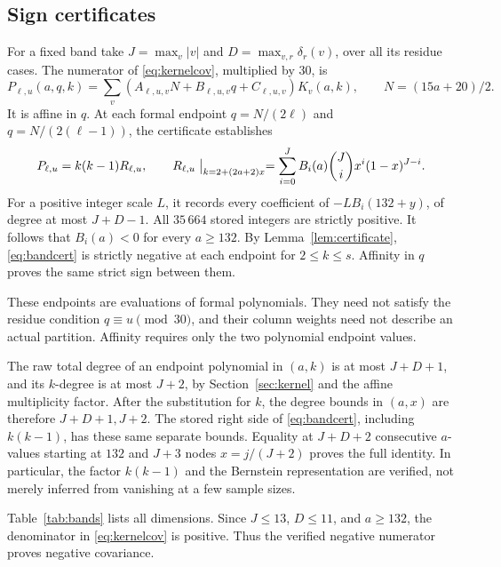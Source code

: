 \documentclass[11pt,a4paper]{article}
\theoremstyle{remark}
\numberwithin{equation}{section}
\begin{document}
\subsection{Sign certificates}
For a fixed band take \(J=\max_v|v|\) and
\(D=\max_{v,r}\delta_r(v)\), over all its residue cases.
The numerator of \eqref{eq:kernelcov}, multiplied by \(30\), is
\begin{equation}\label{eq:bandraw}
 P_{\ell,u}(a,q,k)=
 \sum_v(A_{\ell,u,v}N+B_{\ell,u,v}q+C_{\ell,u,v})K_v(a,k),
 \qquad N=(15a+20)/2.
\end{equation}
It is affine in \(q\).
At each formal endpoint \(q=N/(2\ell)\) and
\(q=N/(2(\ell-1))\), the certificate establishes
\begin{equation}\label{eq:bandcert}
 P_{\ell,u}=k(k-1)R_{\ell,u},\qquad
 R_{\ell,u}\bigm|_{k=2+(2a+2)x}
 =\sum_{i=0}^{J} B_i(a)\binom Ji x^i(1-x)^{J-i}.
\end{equation}
For a positive integer scale \(L\), it records every coefficient of
\(-L B_i(132+y)\), of degree at most \(J+D-1\).
All \(35\,664\) stored integers are strictly positive.
It follows that \(B_i(a)<0\) for every \(a\ge132\).
By Lemma~\ref{lem:certificate}, \eqref{eq:bandcert} is strictly
negative at each endpoint for \(2\le k\le s\).
Affinity in \(q\) proves the same strict sign between them.

These endpoints are evaluations of formal polynomials.
They need not satisfy the residue condition \(q\equiv u\pmod{30}\),
and their column weights need not describe an actual partition.
Affinity requires only the two polynomial endpoint values.

The raw total degree of an endpoint polynomial in \((a,k)\)
is at most \(J+D+1\), and its \(k\)-degree is at most \(J+2\),
by Section~\ref{sec:kernel} and the affine multiplicity factor.
After the substitution for \(k\), the degree bounds in \((a,x)\)
are therefore \(J+D+1,J+2\).
The stored right side of \eqref{eq:bandcert}, including \(k(k-1)\),
has these same separate bounds. Equality at
\(J+D+2\) consecutive \(a\)-values starting at \(132\) and
\(J+3\) nodes \(x=j/(J+2)\) proves the full identity.
In particular, the factor \(k(k-1)\) and the Bernstein
representation are verified, not merely inferred from vanishing
at a few sample sizes.

Table~\ref{tab:bands} lists all dimensions.
Since \(J\le13\), \(D\le11\), and \(a\ge132\), the denominator
in \eqref{eq:kernelcov} is positive.
Thus the verified negative numerator proves negative covariance.
\end{document}
